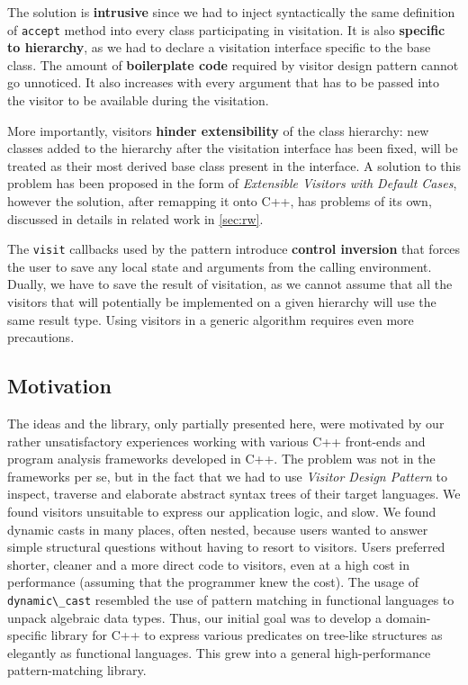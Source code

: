\documentclass[preprint]{sigplanconf}
\makeatletter
\DeclareRobustCommand{\code}[1]{{\lstinline[breaklines=false,escapechar=@]{#1}}}
\makeatother
\begin{document}
The solution is {\bf intrusive} since we had to inject syntactically the same 
definition of \code{accept} method into every class participating in visitation. 
It is also {\bf specific to hierarchy}, as we had to declare a visitation 
interface specific to the base class. The amount of {\bf boilerplate code} 
required by visitor design pattern cannot go unnoticed. It also increases with 
every argument that has to be passed into the visitor to be available during the 
visitation.

More importantly, visitors {\bf hinder extensibility} of the class hierarchy: 
new classes added to the hierarchy after the visitation interface has been 
fixed, will be treated as their most derived base class present in the interface.
A solution to this problem has been proposed in the form of \emph{Extensible 
Visitors with Default Cases}\cite[]{Zenger:2001}, however the 
solution, after remapping it onto C++, has problems of its own, discussed in 
details in related work in \textsection\ref{sec:rw}.

The \code{visit} callbacks used by the pattern introduce {\bf control inversion} 
that forces the user to save any local state and arguments from the calling 
environment. Dually, we have to save the result of visitation, as we cannot 
assume that all the visitors that will potentially be implemented on a given 
hierarchy will use the same result type. Using visitors in a generic algorithm 
requires even more precautions.

\subsection{Motivation}

The ideas and the library, only partially presented here, were motivated by our 
rather unsatisfactory experiences working with various C++ front-ends and 
program analysis frameworks developed in C++\cite{Pivot09,Phoenix,Clang,Lise}. 
The problem was not in the frameworks per se, but in the fact that we had to use
\emph{Visitor Design Pattern}\cite{DesignPatterns1993} to inspect, traverse and 
elaborate abstract syntax trees of their target languages. We found visitors 
unsuitable to express our application logic, and slow. We found dynamic casts in 
many places, often nested, because users wanted to answer simple structural 
questions without having to resort to visitors. Users preferred shorter, cleaner 
and a more direct code to visitors, even at a high cost in performance (assuming 
that the programmer knew the cost). The usage of \code{dynamic\_cast} resembled 
the use of pattern matching in functional languages to unpack algebraic data 
types. Thus, our initial goal was to develop a domain-specific library for C++ 
to express various predicates on tree-like structures as elegantly as functional 
languages. This grew into a general high-performance pattern-matching library.
\end{document}
